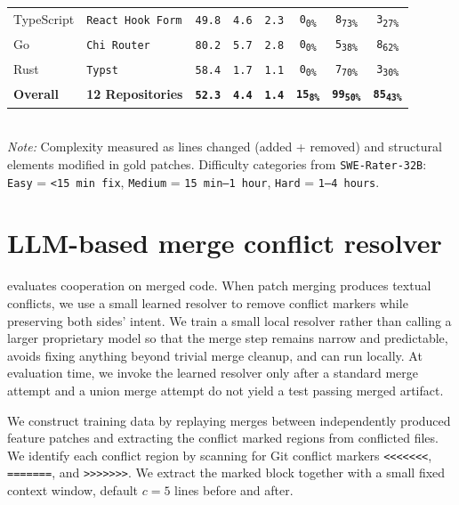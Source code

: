 \begin{table}[htbp]
{\begin{tabular}{llcccccc}
    TypeScript & \texttt{React Hook Form} & \texttt{49.8} & \texttt{4.6} & \texttt{2.3} & \texttt{0}\textsubscript{\texttt{0\%}} & \texttt{8}\textsubscript{\texttt{73\%}} & \texttt{3}\textsubscript{\texttt{27\%}} \\
    Go & \texttt{Chi Router} & \texttt{80.2} & \texttt{5.7} & \texttt{2.8} & \texttt{0}\textsubscript{\texttt{0\%}} & \texttt{5}\textsubscript{\texttt{38\%}} & \texttt{8}\textsubscript{\texttt{62\%}} \\
    Rust & \texttt{Typst} & \texttt{58.4} & \texttt{1.7} & \texttt{1.1} & \texttt{0}\textsubscript{\texttt{0\%}} & \texttt{7}\textsubscript{\texttt{70\%}} & \texttt{3}\textsubscript{\texttt{30\%}} \\
    \midrule
    \textbf{Overall} & \textbf{12 Repositories} & \textbf{\texttt{52.3}} & \textbf{\texttt{4.4}} & \textbf{\texttt{1.4}} & \textbf{\texttt{15}\textsubscript{\texttt{8\%}}} & \textbf{\texttt{99}\textsubscript{\texttt{50\%}}} & \textbf{\texttt{85}\textsubscript{\texttt{43\%}}} \\
    \bottomrule
  \end{tabular}
  }
  \\[0.5em]
  \small \textit{Note:} Complexity measured as lines changed (added + removed) and structural elements modified in gold patches.
  Difficulty categories from \texttt{SWE-Rater-32B}: \texttt{Easy} = \texttt{<15 min fix}, \texttt{Medium} = \texttt{15 min--1 hour}, \texttt{Hard} = \texttt{1--4 hours}.
  \label{tab:complexity_stats}
\end{table}






\section{LLM-based merge conflict resolver}\label{app:resolver}

\dataset{} evaluates cooperation on merged code. When patch merging produces textual conflicts, we use a small learned resolver to remove conflict markers while preserving both sides' intent. We train a small local resolver rather than calling a larger proprietary model so that the merge step remains narrow and predictable, avoids fixing anything beyond trivial merge cleanup, and can run locally. At evaluation time, we invoke the learned resolver only after a standard merge attempt and a union merge attempt do not yield a test passing merged artifact.

We construct training data by replaying merges between independently produced feature patches and extracting the conflict marked regions from conflicted files. We identify each conflict region by scanning for Git conflict markers \verb|<<<<<<<|, \verb|=======|, and \verb|>>>>>>>|. We extract the marked block together with a small fixed context window, default $c=5$ lines before and after.

